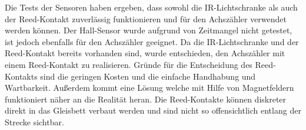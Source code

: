 Die Tests der Sensoren haben ergeben, dass sowohl die IR-Lichtschranke als auch der Reed-Kontakt zuverlässig funktionieren und für den Achszähler verwendet werden können. Der Hall-Sensor wurde aufgrund von Zeitmangel nicht getestet, ist jedoch ebenfalls für den Achszähler geeignet. Da die IR-Lichtschranke und der Reed-Kontakt bereits vorhanden sind, wurde entschieden, den Achszähler mit einem Reed-Kontakt zu realisieren.
\newline
Gründe für die Entscheidung des Reed-Kontakts sind die geringen Kosten und die einfache Handhabung und Wartbarkeit. Außerdem kommt eine Lösung welche mit Hilfe von Magnetfeldern funktioniert näher an die Realität heran. Die Reed-Kontakte können diskreter direkt in das Gleisbett verbaut werden und sind nicht so offensichtlich entlang der Strecke sichtbar.

